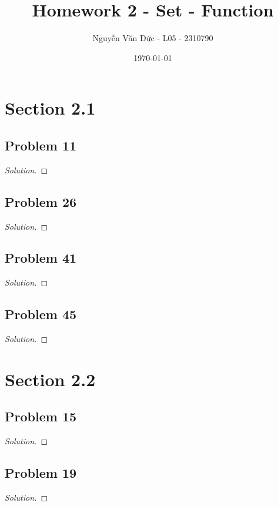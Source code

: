 \documentclass{article}
\title{Homework 2 - Set - Function}
\author{Nguyễn Văn Đức - L05 - 2310790}
\date\today
\newenvironment{solution}{\renewcommand\qedsymbol{}\begin{proof}[Solution]}{\end{proof}}
\begin{document}
\maketitle

\section*{Section 2.1}
\subsection*{Problem 11}
\begin{solution}
\end{solution}
\clearpage

\subsection*{Problem 26}
\begin{solution}
\end{solution}
\clearpage

\subsection*{Problem 41}
\begin{solution}
\end{solution}
\clearpage

\subsection*{Problem 45}
\begin{solution}
\end{solution}
\clearpage

\section*{Section 2.2}
\subsection*{Problem 15}
\begin{solution}
\end{solution}
\clearpage

\subsection*{Problem 19}
\begin{solution}
\end{solution}
\clearpage
\end{document}
